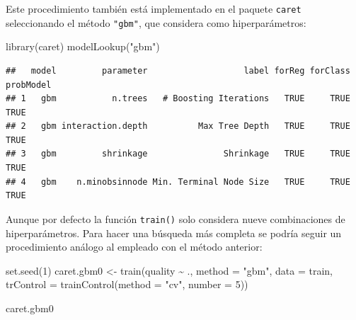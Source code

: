 \documentclass[
]{book}
\newenvironment{Shaded}{\begin{snugshade}}{\end{snugshade}}
\newcommand{\AttributeTok}[1]{\textcolor[rgb]{0.77,0.63,0.00}{#1}}
\newcommand{\DecValTok}[1]{\textcolor[rgb]{0.00,0.00,0.81}{#1}}
\newcommand{\FunctionTok}[1]{\textcolor[rgb]{0.00,0.00,0.00}{#1}}
\newcommand{\NormalTok}[1]{#1}
\newcommand{\OtherTok}[1]{\textcolor[rgb]{0.56,0.35,0.01}{#1}}
\newcommand{\SpecialCharTok}[1]{\textcolor[rgb]{0.00,0.00,0.00}{#1}}
\newcommand{\StringTok}[1]{\textcolor[rgb]{0.31,0.60,0.02}{#1}}
\theoremstyle{break}
\theoremstyle{definition}
\theoremstyle{definition}
\theoremstyle{definition}
\theoremstyle{definition}
\theoremstyle{remark}
\begin{document}
Este procedimiento también está implementado en el paquete \texttt{caret} seleccionando el método \texttt{"gbm"}, que considera como hiperparámetros:

\begin{Shaded}
\begin{Highlighting}[]
\FunctionTok{library}\NormalTok{(caret)}
\FunctionTok{modelLookup}\NormalTok{(}\StringTok{"gbm"}\NormalTok{)}
\end{Highlighting}
\end{Shaded}

\begin{verbatim}
##   model         parameter                   label forReg forClass probModel
## 1   gbm           n.trees   # Boosting Iterations   TRUE     TRUE      TRUE
## 2   gbm interaction.depth          Max Tree Depth   TRUE     TRUE      TRUE
## 3   gbm         shrinkage               Shrinkage   TRUE     TRUE      TRUE
## 4   gbm    n.minobsinnode Min. Terminal Node Size   TRUE     TRUE      TRUE
\end{verbatim}

Aunque por defecto la función \texttt{train()} solo considera nueve combinaciones de hiperparámetros. Para hacer una búsqueda más completa se podría seguir un procedimiento análogo al empleado con el método anterior:

\begin{Shaded}
\begin{Highlighting}[]
\FunctionTok{set.seed}\NormalTok{(}\DecValTok{1}\NormalTok{)}
\NormalTok{caret.gbm0 }\OtherTok{\textless{}{-}} \FunctionTok{train}\NormalTok{(quality }\SpecialCharTok{\textasciitilde{}}\NormalTok{ ., }\AttributeTok{method =} \StringTok{"gbm"}\NormalTok{, }\AttributeTok{data =}\NormalTok{ train,}
                   \AttributeTok{trControl =} \FunctionTok{trainControl}\NormalTok{(}\AttributeTok{method =} \StringTok{"cv"}\NormalTok{, }\AttributeTok{number =} \DecValTok{5}\NormalTok{))}
\end{Highlighting}
\end{Shaded}

\begin{Shaded}
\begin{Highlighting}[]
\NormalTok{caret.gbm0}
\end{Highlighting}
\end{Shaded}
\end{document}
